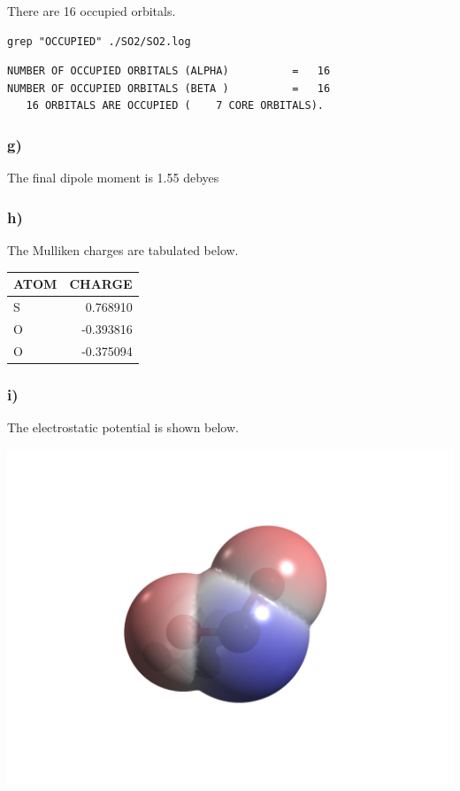 \documentclass[11pt]{article}
\begin{document}
There are 16 occupied orbitals.

\begin{verbatim}
grep "OCCUPIED" ./SO2/SO2.log
\end{verbatim}

\begin{verbatim}
NUMBER OF OCCUPIED ORBITALS (ALPHA)          =   16
NUMBER OF OCCUPIED ORBITALS (BETA )          =   16
   16 ORBITALS ARE OCCUPIED (    7 CORE ORBITALS).
\end{verbatim}




\subsubsection{g)}
\label{sec-2-1-7}

The final dipole moment is 1.55 debyes

\subsubsection{h)}
\label{sec-2-1-8}

The Mulliken charges are tabulated below.

\begin{center}
\begin{tabular}{lr}
ATOM & CHARGE\\
\hline
S & 0.768910\\
O & -0.393816\\
O & -0.375094\\
\end{tabular}
\end{center}


\subsubsection{i)}
\label{sec-2-1-9}

The electrostatic potential is shown below.

\includegraphics[width=.9\linewidth]{SO2/SO2-electrostatic-potential.png}
\end{document}
